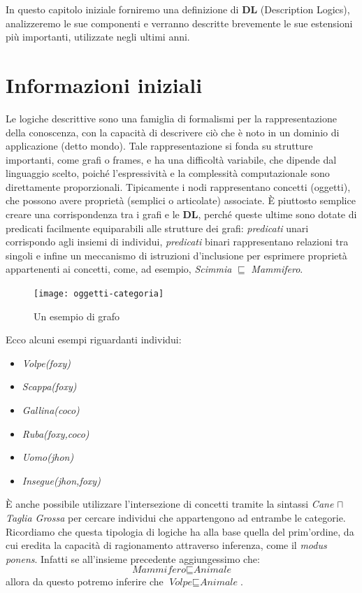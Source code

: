 In questo capitolo iniziale forniremo una definizione di \textbf{DL} (Description Logics), analizzeremo le sue componenti e verranno descritte brevemente le sue estensioni più importanti, utilizzate negli ultimi anni.
\section{Informazioni iniziali}
Le logiche descrittive sono una famiglia di formalismi per la rappresentazione
della conoscenza, con la capacità di descrivere ciò che è noto in un dominio di
applicazione (detto mondo). Tale rappresentazione si fonda su strutture importanti,
come grafi o frames, e ha una difficoltà variabile, che dipende dal linguaggio scelto,
poiché l'espressività e la complessità computazionale sono direttamente proporzionali.
Tipicamente i nodi rappresentano concetti (oggetti), che possono
avere proprietà (semplici o articolate) associate. È piuttosto
semplice creare una corrispondenza tra i grafi e le \textbf{DL},
perché queste ultime sono dotate di predicati facilmente equiparabili alle strutture dei grafi:
\textit{predicati} unari corrispondo agli insiemi di individui, 
\textit{predicati} binari rappresentano relazioni tra singoli e infine un meccanismo di istruzioni 
d'inclusione per esprimere proprietà appartenenti ai concetti, come, ad esempio, \textit{Scimmia }$\sqsubseteq$\textit{ Mammifero}.

\begin{figure}[ht]
	\texttt{[image: oggetti-categoria]}
	\centering
	\caption{Un esempio di grafo}
\end{figure}

Ecco alcuni esempi riguardanti individui:
\begin{itemize}
	\item \textit{Volpe(foxy)}
	\item \textit{Scappa(foxy)}
	\item \textit{Gallina(coco)}
	\item \textit{Ruba(foxy,coco)}
	\item \textit{Uomo(jhon)}
	\item \textit{Insegue(jhon,foxy)}
\end{itemize}

È anche possibile utilizzare l’intersezione di concetti tramite la sintassi 
\textit{Cane} $\sqcap$ \textit{Taglia Grossa} per cercare individui che 
appartengono ad entrambe le categorie. \\
Ricordiamo che questa tipologia di logiche 
ha alla base quella del prim'ordine, da cui eredita la capacità di 
ragionamento attraverso inferenza, come il \textit{modus ponens}.
Infatti se all'insieme precedente aggiungessimo che:
\[\textit{Mammifero} \sqsubseteq \textit{Animale}\]
allora da questo potremo inferire che $\textit{Volpe}\sqsubseteq\textit{Animale}$.

